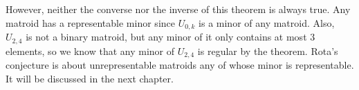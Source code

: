 However, neither the converse nor the inverse of this theorem is always true.
Any matroid has a representable minor since $U_{0, k}$ is a minor of any matroid.
Also, $U_{2, 4}$ is not a binary matroid, but any minor of it only contains at most 3 elements, so we know that any minor of $U_{2,4}$ is regular by the theorem.
Rota's conjecture is about unrepresentable matroids any of whose minor is representable.
It will be discussed in the next chapter.



